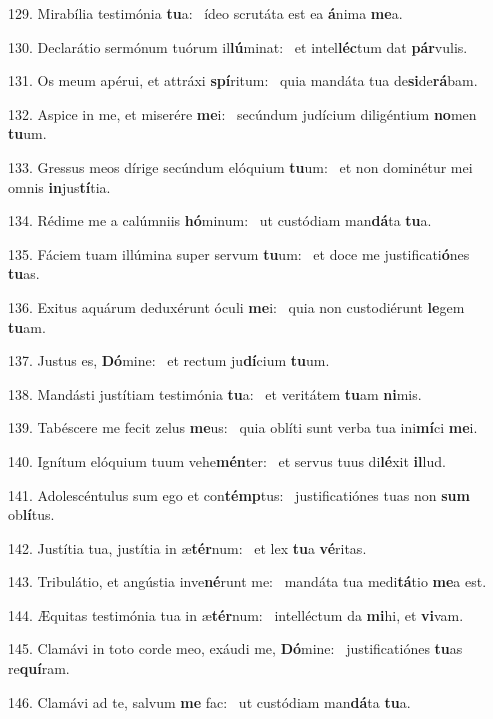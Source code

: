 129. Mirabília testimónia \textbf{tu}a: \ast\  ídeo scrutáta est ea \textbf{á}nima \textbf{me}a.\

130. Declarátio sermónum tuórum il\textbf{lú}minat: \ast\  et intel\textbf{léc}tum dat \textbf{pár}vulis.\

131. Os meum apérui, et attráxi \textbf{spí}ritum: \ast\  quia mandáta tua de\textbf{si}de\textbf{rá}bam.\

132. Aspice in me, et miserére \textbf{me}i: \ast\  secúndum judícium diligéntium \textbf{no}men \textbf{tu}um.\

133. Gressus meos dírige secúndum elóquium \textbf{tu}um: \ast\  et non dominétur mei omnis \textbf{in}jus\textbf{tí}tia.\

134. Rédime me a calúmniis \textbf{hó}minum: \ast\  ut custódiam man\textbf{dá}ta \textbf{tu}a.\

135. Fáciem tuam illúmina super servum \textbf{tu}um: \ast\  et doce me justificati\textbf{ó}nes \textbf{tu}as.\

136. Exitus aquárum deduxérunt óculi \textbf{me}i: \ast\  quia non custodiérunt \textbf{le}gem \textbf{tu}am.\

137. Justus es, \textbf{Dó}mine: \ast\  et rectum ju\textbf{dí}cium \textbf{tu}um.\

138. Mandásti justítiam testimónia \textbf{tu}a: \ast\  et veritátem \textbf{tu}am \textbf{ni}mis.\

139. Tabéscere me fecit zelus \textbf{me}us: \ast\  quia oblíti sunt verba tua ini\textbf{mí}ci \textbf{me}i.\

140. Ignítum elóquium tuum vehe\textbf{mén}ter: \ast\  et servus tuus di\textbf{lé}xit \textbf{il}lud.\

141. Adolescéntulus sum ego et con\textbf{témp}tus: \ast\  justificatiónes tuas non \textbf{sum} ob\textbf{lí}tus.\

142. Justítia tua, justítia in æ\textbf{tér}num: \ast\  et lex \textbf{tu}a \textbf{vé}ritas.\

143. Tribulátio, et angústia inve\textbf{né}runt me: \ast\  mandáta tua medi\textbf{tá}tio \textbf{me}a est.\

144. Æquitas testimónia tua in æ\textbf{tér}num: \ast\  intelléctum da \textbf{mi}hi, et \textbf{vi}vam.\

145. Clamávi in toto corde meo, exáudi me, \textbf{Dó}mine: \ast\  justificatiónes \textbf{tu}as re\textbf{quí}ram.\

146. Clamávi ad te, salvum \textbf{me} fac: \ast\  ut custódiam man\textbf{dá}ta \textbf{tu}a.\

